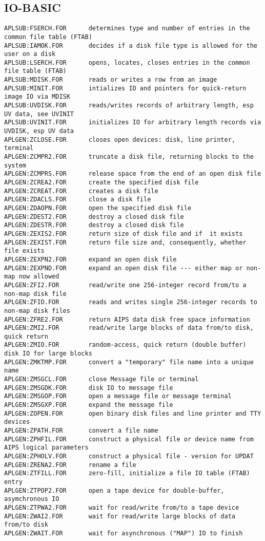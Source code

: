 \subsection{IO-BASIC}
\begin{verbatim}
APLSUB:FSERCH.FOR      determines type and number of entries in the common file table (FTAB)
APLSUB:IAMOK.FOR       decides if a disk file type is allowed for the user on a disk
APLSUB:LSERCH.FOR      opens, locates, closes entries in the common file table (FTAB)
APLSUB:MDISK.FOR       reads or writes a row from an image
APLSUB:MINIT.FOR       intializes IO and pointers for quick-return image IO via MDISK
APLSUB:UVDISK.FOR      reads/writes records of arbitrary length, esp UV data, see UVINIT
APLSUB:UVINIT.FOR      initializes IO for arbitrary length records via UVDISK, esp UV data
APLGEN:ZCLOSE.FOR      closes open devices: disk, line printer, terminal
APLGEN:ZCMPR2.FOR      truncate a disk file, returning blocks to the system
APLGEN:ZCMPRS.FOR      release space from the end of an open disk file
APLGEN:ZCREA2.FOR      create the specified disk file
APLGEN:ZCREAT.FOR      creates a disk file
APLGEN:ZDACLS.FOR      close a disk file
APLGEN:ZDAOPN.FOR      open the specified disk file
APLGEN:ZDEST2.FOR      destroy a closed disk file
APLGEN:ZDESTR.FOR      destroy a closed disk file
APLGEN:ZEXIS2.FOR      return size of disk file and if  it exists
APLGEN:ZEXIST.FOR      return file size and, consequently, whether file exists
APLGEN:ZEXPN2.FOR      expand an open disk file
APLGEN:ZEXPND.FOR      expand an open disk file --- either map or non-map now allowed
APLGEN:ZFI2.FOR        read/write one 256-integer record from/to a non-map disk file
APLGEN:ZFIO.FOR        reads and writes single 256-integer records to non-map disk files
APLGEN:ZFRE2.FOR       return AIPS data disk free space information
APLGEN:ZMI2.FOR        read/write large blocks of data from/to disk, quick return
APLGEN:ZMIO.FOR        random-access, quick return (double buffer) disk IO for large blocks
APLGEN:ZMKTMP.FOR      convert a "temporary" file name into a unique name
APLGEN:ZMSGCL.FOR      close Message file or terminal
APLGEN:ZMSGDK.FOR      disk IO to message file
APLGEN:ZMSGOP.FOR      open a message file or message terminal
APLGEN:ZMSGXP.FOR      expand the message file
APLGEN:ZOPEN.FOR       open binary disk files and line printer and TTY devices
APLGEN:ZPATH.FOR       convert a file name
APLGEN:ZPHFIL.FOR      construct a physical file or device name from AIPS logical parameters
APLGEN:ZPHOLV.FOR      construct a physical file - version for UPDAT
APLGEN:ZRENA2.FOR      rename a file
APLGEN:ZTFILL.FOR      zero-fill, initialize a file IO table (FTAB) entry
APLGEN:ZTPOP2.FOR      open a tape device for double-buffer, asymchronous IO
APLGEN:ZTPWA2.FOR      wait for read/write from/to a tape device
APLGEN:ZWAI2.FOR       wait for read/write large blocks of data from/to disk
APLGEN:ZWAIT.FOR       wait for asynchronous ("MAP") IO to finish
\end{verbatim}
 

